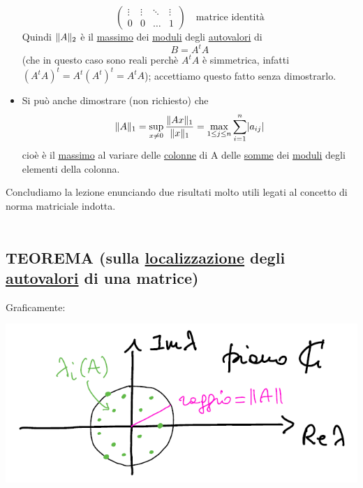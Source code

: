 \begin{itemize}
\[\begin{pmatrix}
        \vdots & \vdots & \ddots & \vdots \\
        0 & 0 & \dotso & 1
    \end{pmatrix} \quad \text{matrice identità}\]
    Quindi $\lVert A\rVert_2$ è il \uline{massimo} dei \uline{moduli} degli \uline{autovalori} di \[B = A^t A\]
    (che in questo caso sono reali perchè $A^t A$ è simmetrica,
    infatti $(A^t A)^t = A^t(A^t)^t = A^t A$); accettiamo questo fatto senza dimostrarlo. \\
    \item Si può anche dimostrare (non richiesto) che
    \[\lVert A\rVert_1 = \sup_{x \ne 0} \frac{\lVert Ax\rVert_1}{\lVert x\rVert_1} = \max_{1 \le j \le n} \sum_{i=1}^n \lvert a_{ij}\rvert\]
    cioè è il \uline{massimo} al variare delle \uline{colonne} di A delle \uline{somme} dei \uline{moduli} degli elementi della colonna.
\end{itemize}

\bigskip
Concludiamo la lezione enunciando due risultati molto utili legati al concetto di norma matriciale indotta.\\\\

\subsection{TEOREMA (sulla \uline{localizzazione} degli \uline{autovalori} di una matrice)}
\begin{center}
\end{center}
Graficamente:
\begin{center}
    \includegraphics[scale=0.5]{foto/lez19_img2}    
\end{center}

